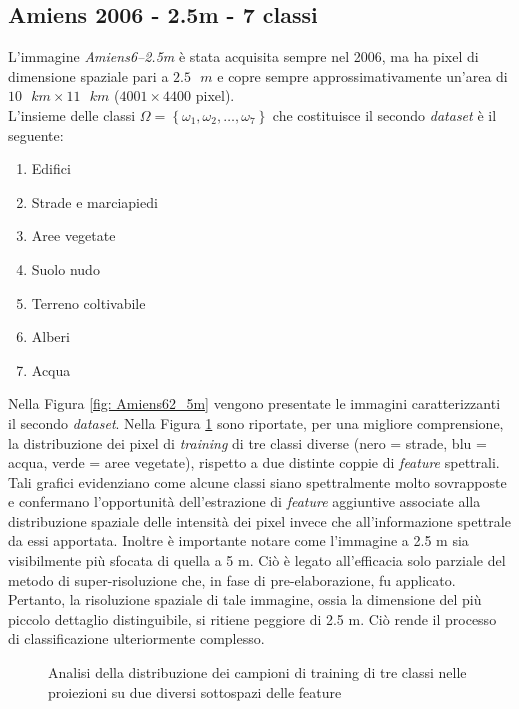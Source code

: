 \clearpage
\subsection{Amiens 2006 - 2.5m - 7 classi}
L'immagine \emph{Amiens6--2.5m} è stata acquisita sempre nel 2006, ma ha pixel di dimensione spaziale pari a $2.5\text{ }m$  e copre sempre approssimativamente un'area di $10\text{ }km\times11\text{ }km$ ($4001\times4400$ pixel).\\
L'insieme delle classi $\Omega=\left\lbrace\omega_1,\omega_2,\ldots,\omega_{7}\right\rbrace$ che costituisce il secondo \emph{dataset} è il seguente:
\begin{enumerate}
\item Edifici
\item Strade e marciapiedi
\item Aree vegetate
\item Suolo nudo
\item Terreno coltivabile
\item Alberi
\item Acqua
\end{enumerate}
Nella Figura \ref{fig: Amiens62_5m} vengono presentate le immagini caratterizzanti il secondo \emph{dataset}. Nella Figura \ref{fig:3classi} sono riportate, per una migliore comprensione, la distribuzione dei pixel di\emph{ training} di tre classi diverse (nero = strade, blu = acqua, verde = aree vegetate), rispetto a due distinte coppie di \emph{feature} spettrali. Tali grafici evidenziano come alcune classi siano spettralmente molto sovrapposte e confermano l'opportunità dell'estrazione di \emph{feature} aggiuntive associate alla distribuzione spaziale delle intensità dei pixel invece che all'informazione spettrale da essi apportata. Inoltre è importante notare come l'immagine a 2.5 m sia visibilmente più sfocata di quella a 5 m. Ciò è legato all'efficacia solo parziale del metodo di super-risoluzione che, in fase di pre-elaborazione, fu applicato. Pertanto, la risoluzione spaziale di tale immagine, ossia la dimensione del più piccolo dettaglio distinguibile, si ritiene peggiore di 2.5 m. Ciò rende il processo di classificazione ulteriormente complesso.

 \begin{figure}[!ht]
\center  
{}
      \hspace{3mm}
		
    \caption{Analisi della distribuzione dei campioni di training di tre classi nelle proiezioni su due diversi sottospazi delle feature}
    \label{fig:3classi}
  \end{figure}


